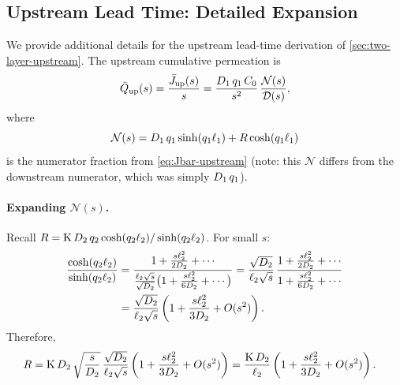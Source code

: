 \subsection{Upstream Lead Time: Detailed Expansion}
\label{sec:app-upstream-details}

We provide additional details for the upstream lead-time derivation of
\cref{sec:two-layer-upstream}.  The upstream cumulative permeation is
\begin{equation}
  \bar{Q}_{\mathrm{up}}(s) = \frac{\bar{J}_{\mathrm{up}}(s)}{s}
  = \frac{D_{1}\,q_1\,C_0}{s^2}\,
  \frac{\mathcal{N}(s)}{\mathcal{D}(s)},
\end{equation}
where
\begin{equation}
  \mathcal{N}(s) = D_{1}\,q_1\sinh(q_1\ell_{1}) + R\cosh(q_1\ell_{1})
\end{equation}
is the numerator fraction from \cref{eq:Jbar-upstream} (note: this
$\mathcal{N}$ differs from the downstream numerator, which was simply
$D_{1}\,q_1$).

\paragraph{Expanding $\mathcal{N}(s)$.}
Recall $R = \mathrm{K}\,D_{2}\,q_2\cosh(q_2\ell_{2})/\sinh(q_2\ell_{2})$.
For small $s$:
\begin{align}
  \frac{\cosh(q_2\ell_{2})}{\sinh(q_2\ell_{2})}
  &= \frac{1 + \frac{s\ell_{2}^2}{2D_{2}} + \cdots}
  {\frac{\ell_{2}\sqrt{s}}{\sqrt{D_{2}}}
  \bigl(1 + \frac{s\ell_{2}^2}{6D_{2}} + \cdots\bigr)}
  = \frac{\sqrt{D_{2}}}{\ell_{2}\sqrt{s}}\,
  \frac{1 + \frac{s\ell_{2}^2}{2D_{2}} + \cdots}
  {1 + \frac{s\ell_{2}^2}{6D_{2}} + \cdots}
  \notag\\
  &= \frac{\sqrt{D_{2}}}{\ell_{2}\sqrt{s}}
  \left(1 + \frac{s\ell_{2}^2}{3D_{2}} + O(s^2)\right).
\end{align}
Therefore,
\begin{align}
  R &= \mathrm{K}\,D_{2}\,\sqrt{\frac{s}{D_{2}}}\,
  \frac{\sqrt{D_{2}}}{\ell_{2}\sqrt{s}}
  \left(1 + \frac{s\ell_{2}^2}{3D_{2}} + O(s^2)\right)
  = \frac{\mathrm{K}\,D_{2}}{\ell_{2}}
  \left(1 + \frac{s\ell_{2}^2}{3D_{2}} + O(s^2)\right).
\end{align}

